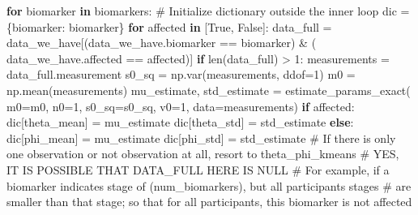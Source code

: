 \documentclass[
  letterpaper,
  DIV=11,
  numbers=noendperiod]{scrreprt}
\newenvironment{Shaded}{\begin{snugshade}}{\end{snugshade}}
\newcommand{\BuiltInTok}[1]{\textcolor[rgb]{0.00,0.23,0.31}{#1}}
\newcommand{\CommentTok}[1]{\textcolor[rgb]{0.37,0.37,0.37}{#1}}
\newcommand{\ControlFlowTok}[1]{\textcolor[rgb]{0.00,0.23,0.31}{\textbf{#1}}}
\newcommand{\DecValTok}[1]{\textcolor[rgb]{0.68,0.00,0.00}{#1}}
\newcommand{\KeywordTok}[1]{\textcolor[rgb]{0.00,0.23,0.31}{\textbf{#1}}}
\newcommand{\NormalTok}[1]{\textcolor[rgb]{0.00,0.23,0.31}{#1}}
\newcommand{\OperatorTok}[1]{\textcolor[rgb]{0.37,0.37,0.37}{#1}}
\newcommand{\StringTok}[1]{\textcolor[rgb]{0.13,0.47,0.30}{#1}}
\newcommand{\VariableTok}[1]{\textcolor[rgb]{0.07,0.07,0.07}{#1}}
\begin{document}
\begin{Shaded}
\begin{Highlighting}[]
    \ControlFlowTok{for}\NormalTok{ biomarker }\KeywordTok{in}\NormalTok{ biomarkers:}
        \CommentTok{\# Initialize dictionary outside the inner loop}
\NormalTok{        dic }\OperatorTok{=}\NormalTok{ \{}\StringTok{\textquotesingle{}biomarker\textquotesingle{}}\NormalTok{: biomarker\}}
        \ControlFlowTok{for}\NormalTok{ affected }\KeywordTok{in}\NormalTok{ [}\VariableTok{True}\NormalTok{, }\VariableTok{False}\NormalTok{]:}
\NormalTok{            data\_full }\OperatorTok{=}\NormalTok{ data\_we\_have[(data\_we\_have.biomarker }\OperatorTok{==}\NormalTok{ biomarker) }\OperatorTok{\&}\NormalTok{ (}
\NormalTok{                data\_we\_have.affected }\OperatorTok{==}\NormalTok{ affected)]}
            \ControlFlowTok{if} \BuiltInTok{len}\NormalTok{(data\_full) }\OperatorTok{\textgreater{}} \DecValTok{1}\NormalTok{:}
\NormalTok{                measurements }\OperatorTok{=}\NormalTok{ data\_full.measurement}
\NormalTok{                s0\_sq }\OperatorTok{=}\NormalTok{ np.var(measurements, ddof}\OperatorTok{=}\DecValTok{1}\NormalTok{)}
\NormalTok{                m0 }\OperatorTok{=}\NormalTok{ np.mean(measurements)}
\NormalTok{                mu\_estimate, std\_estimate }\OperatorTok{=}\NormalTok{ estimate\_params\_exact(}
\NormalTok{                    m0}\OperatorTok{=}\NormalTok{m0, n0}\OperatorTok{=}\DecValTok{1}\NormalTok{, s0\_sq}\OperatorTok{=}\NormalTok{s0\_sq, v0}\OperatorTok{=}\DecValTok{1}\NormalTok{, data}\OperatorTok{=}\NormalTok{measurements)}
                \ControlFlowTok{if}\NormalTok{ affected:}
\NormalTok{                    dic[}\StringTok{\textquotesingle{}theta\_mean\textquotesingle{}}\NormalTok{] }\OperatorTok{=}\NormalTok{ mu\_estimate}
\NormalTok{                    dic[}\StringTok{\textquotesingle{}theta\_std\textquotesingle{}}\NormalTok{] }\OperatorTok{=}\NormalTok{ std\_estimate}
                \ControlFlowTok{else}\NormalTok{:}
\NormalTok{                    dic[}\StringTok{\textquotesingle{}phi\_mean\textquotesingle{}}\NormalTok{] }\OperatorTok{=}\NormalTok{ mu\_estimate}
\NormalTok{                    dic[}\StringTok{\textquotesingle{}phi\_std\textquotesingle{}}\NormalTok{] }\OperatorTok{=}\NormalTok{ std\_estimate}
            \CommentTok{\# If there is only one observation or not observation at all, resort to theta\_phi\_kmeans}
            \CommentTok{\# YES, IT IS POSSIBLE THAT DATA\_FULL HERE IS NULL}
            \CommentTok{\# For example, if a biomarker indicates stage of (num\_biomarkers), but all participants\textquotesingle{} stages}
            \CommentTok{\# are smaller than that stage; so that for all participants, this biomarker is not affected}

\end{Highlighting}
\end{Shaded}
\end{document}
